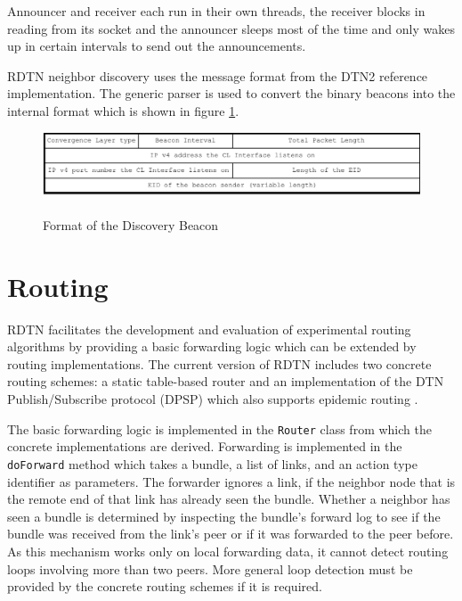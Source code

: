\documentclass[a4paper]{article}
\begin{document}
Announcer and receiver each run in their own threads, the receiver blocks in
reading from its socket and the announcer sleeps most of the time and
only wakes up in certain intervals to send out the announcements.

RDTN neighbor discovery uses the message format from the DTN2 reference
implementation. The generic parser is used to convert the binary beacons into
the internal format which is shown in figure \ref{fig.discovery-format}.

\begin{figure}[h]
\begin{center}
\includegraphics[width=\columnwidth]{discovery-format.pdf}\\
\caption{\label{fig.discovery-format} Format of the Discovery Beacon}
\end{center}
\end{figure}

\section{Routing}\label{sec.routing}

RDTN facilitates the development and evaluation of experimental routing
algorithms by providing a basic forwarding logic which can be extended by
routing implementations. The current version of RDTN includes two concrete
routing schemes: a static table-based router and an implementation of the DTN
Publish/Subscribe protocol (DPSP) \cite{dtn-pubsub} which also supports epidemic
routing \cite{epidemic}.

The basic forwarding logic is implemented in the {\tt Router} class from which
the concrete implementations are derived. Forwarding is implemented in the {\tt
doForward} method which takes a bundle, a list of links, and an action type
identifier as parameters. The forwarder ignores a link, if the neighbor node
that is the remote end of that link has already seen the bundle. Whether a
neighbor has seen a bundle is determined by inspecting the bundle's forward log
to see if the bundle was received from the link's peer or if it was forwarded
to the peer before. As this mechanism works only on local forwarding data, it
cannot detect routing loops involving more than two peers.  More general loop
detection must be provided by the concrete routing schemes if it is required.
\end{document}
